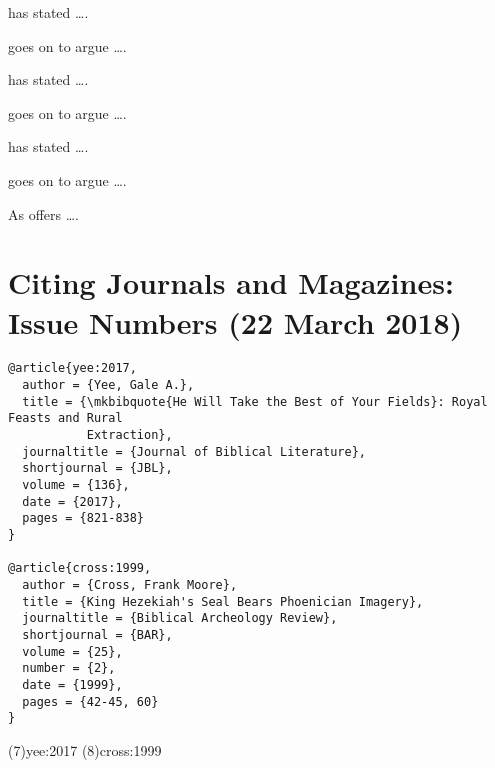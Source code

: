 \documentclass[a4paper]{article}
\begin{document}
\begin{verbcite}
  \citeauthor{eilberg-schwartz:1991} has stated ….
\end{verbcite}
\begin{verbcite}
  \citeauthor{eilberg-schwartz:1991} goes on to argue ….
\end{verbcite}
\begin{verbcite}
  \citeauthor{schusslerfiorenza:1986} has stated ….
\end{verbcite}
\begin{verbcite}
  \citeauthor{schusslerfiorenza:1986} goes on to argue ….
\end{verbcite}
\begin{verbcite}
  \citeauthor{trebollebarrera:2013} has stated ….
\end{verbcite}
\begin{verbcite}
  \citeauthor{trebollebarrera:2013} goes on to argue ….
\end{verbcite}
\begin{verbcite}
  As \citeauthor{hooks:1990} offers ….
\end{verbcite}
\exampleabbreviations
\examplebibliography
{}

\section{Citing Journals and Magazines: Issue Numbers (22 March 2018)}

\begin{verbatim}
@article{yee:2017,
  author = {Yee, Gale A.},
  title = {\mkbibquote{He Will Take the Best of Your Fields}: Royal Feasts and Rural
           Extraction},
  journaltitle = {Journal of Biblical Literature},
  shortjournal = {JBL},
  volume = {136},
  date = {2017},
  pages = {821-838}
}

@article{cross:1999,
  author = {Cross, Frank Moore},
  title = {King Hezekiah's Seal Bears Phoenician Imagery},
  journaltitle = {Biblical Archeology Review},
  shortjournal = {BAR},
  volume = {25},
  number = {2},
  date = {1999},
  pages = {42-45, 60}
}
\end{verbatim}

\examplecite(7){yee:2017}
\examplecite(8){cross:1999}
\exampleabbreviations
\examplebibliography
{}
\end{document}
